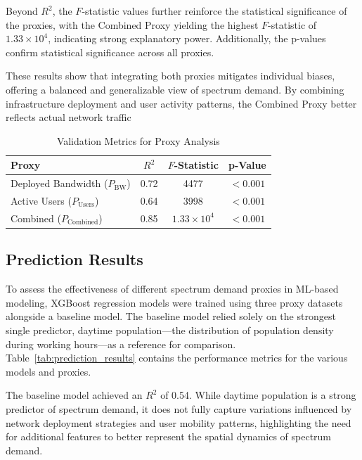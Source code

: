 \documentclass[conference]{IEEEtran}
\begin{document}
Beyond \( R^2 \), the \( F \)-statistic values further reinforce the statistical significance of the proxies, with the Combined Proxy yielding the highest \( F \)-statistic of \( 1.33 \times 10^4 \), indicating strong explanatory power. Additionally, the p-values confirm statistical significance across all proxies. 

These results show that integrating both proxies mitigates individual biases, offering a balanced and generalizable view of spectrum demand. By combining infrastructure deployment and user activity patterns, the Combined Proxy better reflects actual network traffic
\begin{table}[ht]
\centering
\caption{Validation Metrics for Proxy Analysis}
\label{tab:validation_metrics}
\begin{tabular}{lccc}
\toprule
\textbf{Proxy}           & \textbf{\(R^2\)} & \textbf{\(F\)-Statistic} & \textbf{p-Value} \\
\midrule
Deployed Bandwidth (\(P_{\text{BW}}\)) & 0.72 & 4477 & \(< 0.001\) \\
Active Users (\(P_{\text{Users}}\))    & 0.64 & 3998 & \(< 0.001\) \\
Combined (\(P_{\text{Combined}}\))    & 0.85 & \(1.33 \times 10^4\) & \(< 0.001\) \\
\bottomrule
\end{tabular}
\end{table}



\subsection{Prediction Results}

To assess the effectiveness of different spectrum demand proxies in ML-based modeling, XGBoost regression models were trained using three proxy datasets alongside a baseline model. The baseline model relied solely on the strongest single predictor, daytime population—the distribution of population density during working hours—as a reference for comparison. Table~\ref{tab:prediction_results} contains the performance metrics for the various models and proxies.

The baseline model achieved an \( R^2 \) of 0.54. While daytime population is a strong predictor of spectrum demand, it does not fully capture variations influenced by network deployment strategies and user mobility patterns, highlighting the need for additional features to better represent the spatial dynamics of spectrum demand.
\end{document}
